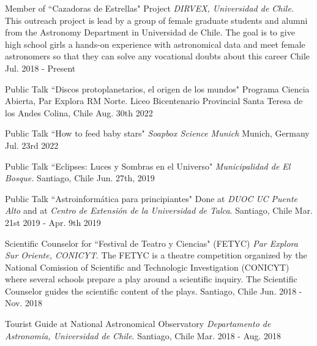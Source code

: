 

\begin{cvhonors}
	
		\cvhonor
	{Member of ``Cazadoras de Estrellas" Project} %
	{\textit{DIRVEX, Universidad de Chile. }This outreach project is lead by a group of female graduate students and alumni from the Astronomy Department in Universidad de Chile. The goal is to give high school girls a hands-on experience with astronomical data and meet female astronomers so that they can solve any vocational doubts about this career} 
	{Chile} %
	{Jul. 2018 - Present} %
	
	\cvhonor
	{Public Talk ``Discos protoplanetarios, el origen de los mundos"} %
	{Programa Ciencia Abierta, Par Explora RM Norte. Liceo Bicentenario Provincial Santa Teresa de los Andes}
	{Colina, Chile} %
	{Aug. 30th 2022} %
	
	\cvhonor
	{Public Talk ``How to feed baby stars"} %
	{\textit{Soapbox Science Munich}} 
	{Munich, Germany} %
	{Jul. 23rd 2022} %

	
	\cvhonor
	{Public Talk ``Eclipses: Luces y Sombras en el Universo"} %
	{\textit{Municipalidad de El Bosque.} } 
	{Santiago, Chile} %
	{Jun. 27th, 2019} %

	\cvhonor
	{Public Talk ``Astroinform\'atica para principiantes"} %
	{Done at \textit{DUOC UC Puente Alto} and at \textit{Centro de Extensi\'on de la Universidad de Talca}. } 
	{Santiago, Chile} %
	{Mar. 21st 2019 - Apr. 9th 2019} %
	
	\cvhonor
	{Scientific Counselor for ``Festival de Teatro y Ciencias" (FETYC)} %
	{\textit{Par Explora Sur Oriente, CONICYT}. The FETYC is a theatre competition organized by the National Comission of Scientific and Technologic Investigation (CONICYT) where several schools prepare a play around a scientific inquiry. The Scientific Counselor guides the scientific content of the plays.} 
	{Santiago, Chile} %
	{Jun. 2018 - Nov. 2018} %
	
	\cvhonor
	{Tourist Guide at National Astronomical Observatory} %
	{\textit{Departamento de Astronom\'ia, Universidad de Chile}. } 
	{Santiago, Chile} %
	{Mar. 2018 - Aug. 2018} %
	
\end{cvhonors}